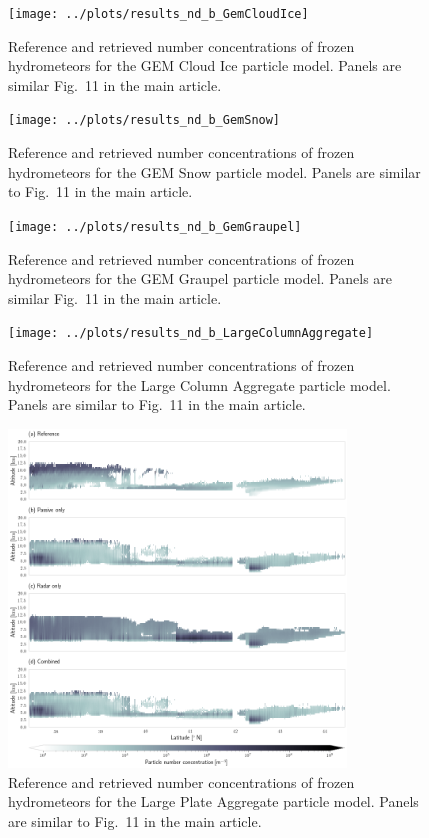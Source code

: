 \documentclass[journal abbreviation, manuscript]{copernicus}
\begin{document}
\clearpage
\begin{figure}[!hbpt]
\centering
\texttt{[image: ../plots/results\_nd\_b\_GemCloudIce]}
\caption{Reference and retrieved number concentrations of frozen hydrometeors for the
  GEM Cloud Ice particle model. Panels are similar Fig.~11 in the main article.}
\end{figure}

\clearpage
\begin{figure}[!hbpt]
\centering
\texttt{[image: ../plots/results\_nd\_b\_GemSnow]}
\caption{Reference and retrieved number concentrations of frozen hydrometeors for the
  GEM Snow particle model. Panels are similar to Fig.~11 in the main article.}
\end{figure}

\begin{figure}[!hbpt]
\centering
\texttt{[image: ../plots/results\_nd\_b\_GemGraupel]}
\caption{Reference and retrieved number concentrations of frozen hydrometeors for the
  GEM Graupel particle model. Panels are similar Fig.~11 in the main article.}
\end{figure}

\clearpage
\begin{figure}[!hbpt]
\centering
\texttt{[image: ../plots/results\_nd\_b\_LargeColumnAggregate]}
\caption{Reference and retrieved number concentrations of frozen hydrometeors for the
  Large Column Aggregate particle model. Panels are similar to Fig.~11 in the main article.}
\end{figure}

\clearpage
\begin{figure}[!hbpt]
\centering
\includegraphics[width = 0.8\textwidth]{../plots/results_nd_b_LargePlateAggregate}
\caption{Reference and retrieved number concentrations of frozen hydrometeors for the
  Large Plate Aggregate particle model. Panels are similar to Fig.~11 in the main article.}
\end{figure}
\end{document}
